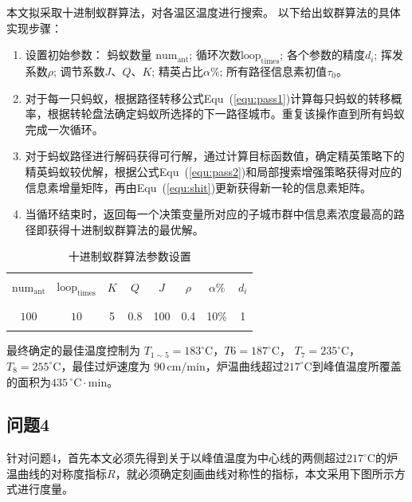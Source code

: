 \documentclass[../main.tex]{subfiles}
\begin{document}
本文拟采取十进制蚁群算法，对各温区温度进行搜索。
以下给出蚁群算法的具体实现步骤：
\begin{enumerate}
	\item 设置初始参数：
	蚂蚁数量 \(\mathrm{num}_{\mathrm{ant}}\); 循环次数\(\mathrm{loop}_{\mathrm{times}}\); 各个参数的精度\(d_i\); 挥发系数\(\rho\); 调节系数\(J\)、\(Q\)、\(K\); 精英占比\(\alpha  \%\); 所有路径信息素初值\(τ_0\)。
	\item 对于每一只蚂蚁，根据路径转移公式Equ~(\ref{equ:pass1})计算每只蚂蚁的转移概率，根据转轮盘法确定蚂蚁所选择的下一路径城市。重复该操作直到所有蚂蚁完成一次循环。
	\item 对于蚂蚁路径进行解码获得可行解，通过计算目标函数值，确定精英策略下的精英蚂蚁较优解，根据公式Equ~(\ref{equ:pass2})和局部搜索增强策略获得对应的信息素增量矩阵，再由Equ~(\ref{equ:shit})更新获得新一轮的信息素矩阵。
	\item 当循环结束时，返回每一个决策变量所对应的子城市群中信息素浓度最高的路径即获得十进制蚁群算法的最优解。
\end{enumerate}
\begin{table}[H]
	\centering
	\begin{tabular}{cccccccc}
	\hline 	\hline
	\\[-1em]
	\(\mathrm{num}_{\mathrm{ant}}\) & \(\mathrm{loop}_{\mathrm{times}}\) & \(K\) & \(Q\) & \(J\) & \(\rho\) & \(\alpha\%\) & \(d_{i}\) \\
	\\[-1em]
	\hline
	\\[-1em]
	\(100\)  & \(10\)  & 5  & 0.8  & 100  & 0.4  & 10\%  & 1
	\\[-1em]
	\\ \hline
	\end{tabular}
	\caption{十进制蚁群算法参数设置}
\end{table}
最终确定的最佳温度控制为 \(T _{1 \sim 5}= 183 ^{\circ}\mathrm{C}\)，\(T6 = 187^{\circ}\mathrm{C}\)，
\(T_{7} = 235^{\circ}\mathrm{C}\)，\(T_8 = 255^{\circ}\mathrm{C}\)，最佳过炉速度为 \(90\,\mathrm{cm}/\mathrm{min}\)，炉温曲线超过\(217 ^{\circ}\mathrm{C}\)到峰值温度所覆盖的面积为\(435\,^{\circ}\mathrm{C} \cdot \mathrm{min}\)。

\subsection{问题4}
针对问题4，首先本文必须先得到关于以峰值温度为中心线的两侧超过\(217^{\circ}\mathrm{C}\)的炉温曲线的对称度指标\(R\)，就必须确定刻画曲线对称性的指标，本文采用下图所示方式进行度量。
\end{document}
